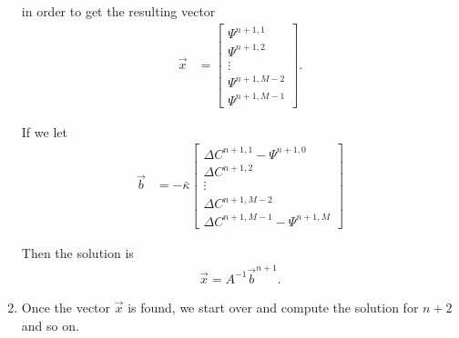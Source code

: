 \begin{enumerate}
in order to get the resulting vector 
\begin{align}
\vec{x} &= \begin{bmatrix}
    \Psi^{n+1, 1}       \\
     \Psi^{n+1, 2}        \\
	\vdots \\
    \Psi^{n+1, M-2}        \\
    \Psi^{n+1, M-1}
\end{bmatrix} .
\end{align}

If we let 
\begin{align}
\vec{b} &= -\bar{\kappa} \begin{bmatrix}
    \Delta C^{n+1, 1}  -\Psi^{n+1, 0}     \\
     \Delta C^{n+1, 2}        \\
	\vdots \\
    \Delta C^{n+1, M-2}        \\
    \Delta C^{n+1, M-1}   -\Psi^{n+1, M} 
\end{bmatrix} 
\end{align}

Then the solution is 
\begin{align}
\vec{x} = A^{-1}\vec{b}^{n+1}.
\end{align}

 
\item Once the vector $\vec{x}$ is found, we start over and compute the solution for $n+2$ and so on.
\end{enumerate}

